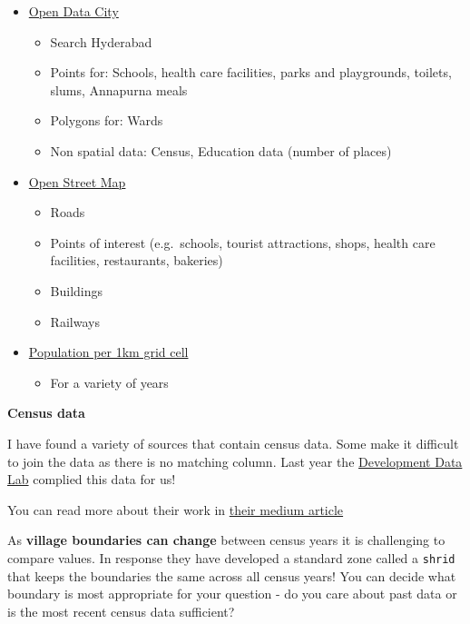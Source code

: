 \documentclass[
  letterpaper,
]{scrbook}
\providecommand{\tightlist}{%
  \setlength{\itemsep}{0pt}\setlength{\parskip}{0pt}}\usepackage{longtable,booktabs,array}
\begin{document}
\begin{itemize}
\tightlist
\item
  \href{https://opencity.in/}{Open Data City}

  \begin{itemize}
  \tightlist
  \item
    Search Hyderabad
  \item
    Points for: Schools, health care facilities, parks and playgrounds,
    toilets, slums, Annapurna meals
  \item
    Polygons for: Wards
  \item
    Non spatial data: Census, Education data (number of places)
  \end{itemize}
\item
  \href{https://download.geofabrik.de/}{Open Street Map}

  \begin{itemize}
  \tightlist
  \item
    Roads
  \item
    Points of interest (e.g.~schools, tourist attractions, shops, health
    care facilities, restaurants, bakeries)
  \item
    Buildings
  \item
    Railways
  \end{itemize}
\item
  \href{https://hub.worldpop.org/project/categories?id=18}{Population
  per 1km grid cell}

  \begin{itemize}
  \tightlist
  \item
    For a variety of years
  \end{itemize}
\end{itemize}

\textbf{Census data}

I have found a variety of sources that contain census data. Some make it
difficult to join the data as there is no matching column. Last year the
\href{https://www.devdatalab.org/shrug_download/}{Development Data Lab}
complied this data for us!

You can read more about their work in
\href{https://devdatalab.medium.com/open-access-geospatial-data-for-india-b9dceb7196bb}{their
medium article}

As \textbf{village boundaries can change} between census years it is
challenging to compare values. In response they have developed a
standard zone called a \texttt{shrid} that keeps the boundaries the same
across all census years! You can decide what boundary is most
appropriate for your question - do you care about past data or is the
most recent census data sufficient?
\end{document}
